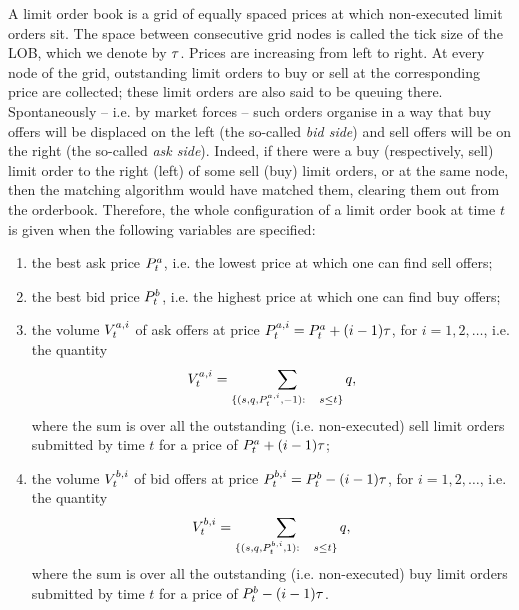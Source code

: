 \documentclass[10pt]{article}
\begin{document}
A limit order book is a grid of equally spaced prices at which non-executed limit orders sit. The space between consecutive grid nodes is called the tick size of the LOB, which we denote by $\tickSizeOfLOB$. Prices are increasing from left to right. At every node of the grid, outstanding limit orders to buy or sell at the corresponding price are collected; these limit orders are also said to be queuing there. Spontaneously -- i.e. by market forces  -- such orders organise in a way that buy offers will be displaced on the left (the so-called \emph{bid side}) and sell offers will be on the right (the so-called \emph{ask side}). Indeed, if there were a buy (respectively, sell) limit order to the right (left) of some sell (buy) limit orders, or at the same node, then the matching algorithm would have matched them, clearing them out from the orderbook.  Therefore, the whole configuration of a limit order book at time $t$ is given when the following variables are specified:
\begin{enumerate}
\item the best ask price $\bestAskPrice_{t}$, i.e. the lowest price at which one can find sell offers;
\item the best bid price $\bestBidPrice_t$, i.e. the highest price at which one can find buy offers;
\item the volume $\nthBestAskVolume[i]_t$ of ask offers at price $\nthBestAskPrice[i]_t= \bestAskPrice_t + (i-1)\tickSizeOfLOB$, for $i=1,2,\dots$, i.e. the quantity 
\begin{equation*}
 \nthBestAskVolume[i]_t = \sum_{\lbrace(s,q,\nthBestAskPrice[i]_t,-1): \quad s\leq t\rbrace} q,
\end{equation*}
where the sum is over all the outstanding (i.e. non-executed) sell limit orders submitted by time $t$ for  a price of $\bestAskPrice_t + (i-1)\tickSizeOfLOB$;
\item the volume $\nthBestBidVolume[i]_t$ of bid offers at price $\nthBestBidPrice[i]_t=\bestBidPrice_t - (i-1)\tickSizeOfLOB$, for $i=1,2,\dots$, i.e. the quantity 
\begin{equation*}
 \nthBestBidVolume[i]_t = \sum_{\lbrace (s,q,\nthBestBidPrice[i]_t,1): \quad s\leq t\rbrace} q,
\end{equation*}
where the sum is over all the outstanding (i.e. non-executed) buy limit orders submitted by time $t$ for  a price of $\bestBidPrice_t - (i-1)\tickSizeOfLOB$.
\end{enumerate} 

\end{document}
